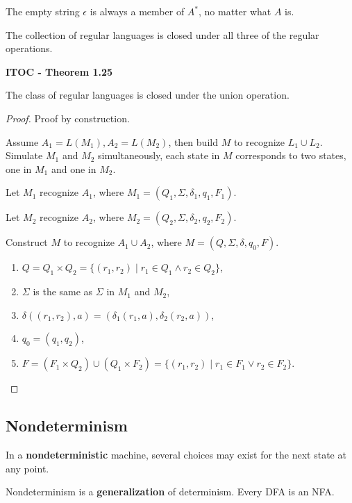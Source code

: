 The empty string $\epsilon$ is always a member of $A^*$, no matter what $A$ is.

{\color{blue}  The collection of regular languages is closed under all three of the regular operations.}

\begin{shaded}
\textbf{ITOC - Theorem 1.25}

\medskip
The class of regular languages is closed under the union operation.
\end{shaded}

\begin{mdframed}
\begin{proof}
Proof by construction. 

Assume
$A_1 = L(M_1), A_2 = L(M_2)$,
then build $M$ to recognize $L_1 \cup L_2$. Simulate $M_1$ and $M_2$ simultaneously, each state in $M$ corresponds to two states, one in $M_1$ and one in $M_2$.

Let $M_1$ recognize $A_1$, where $M_1 = (Q_1, \Sigma, \delta_1, q_1, F_1)$.

Let $M_2$ recognize $A_2$, where $M_2 = (Q_2, \Sigma, \delta_2, q_2, F_2)$.

Construct $M$ to recognize $A_1 \cup A_2$, where $M = (Q, \Sigma, \delta, q_0, F)$.
\begin{enumerate}
\item $Q  = Q_1 \times Q_2 = \{ (r_1, r_2) \mid r_1 \in Q_1 \wedge r_2 \in Q_2\}$,
\item $\Sigma$ is the same as $\Sigma$ in $M_1$ and $M_2$,
\item $\delta((r_1, r_2), a) = (\delta_1(r_1, a), \delta_2(r_2, a))$,
\item $q_0 = (q_1, q_2)$,
\item $F = (F_1 \times Q_2 ) \cup (Q_1 \times F_2) = \{(r_1, r_2) \mid r_1 \in F_1 \vee r_2 \in F_2 \}$.
\end{enumerate}
\end{proof}
\end{mdframed}

\subsection{Nondeterminism}

In a \textbf{nondeterministic} machine, several choices may exist for the next state at any point.

{\color{blue} Nondeterminism is a \textbf{generalization} of determinism.} Every DFA is an NFA.

